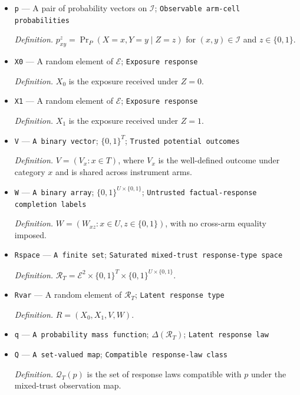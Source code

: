 \documentclass{article}
\begin{document}
\begin{itemize}
  \item \texttt{p} --- A pair of probability vectors on \(\mathcal I\); \texttt{Observable arm-\allowbreak{}cell probabilities}
  \par\smallskip\noindent\emph{Definition.} \(p^z_{xy}=\Pr_P(X=x,Y=y\mid Z=z)\) for \((x,y)\in\mathcal I\) and \(z\in\{0,1\}\).
  \item \texttt{X0} --- A random element of \(\mathcal E\); \texttt{Exposure response}
  \par\smallskip\noindent\emph{Definition.} \(X_0\) is the exposure received under \(Z=0\).
  \item \texttt{X1} --- A random element of \(\mathcal E\); \texttt{Exposure response}
  \par\smallskip\noindent\emph{Definition.} \(X_1\) is the exposure received under \(Z=1\).
  \item \texttt{V} --- \texttt{A binary vector}; \(\{0,1\}^{T}\); \texttt{Trusted potential outcomes}
  \par\smallskip\noindent\emph{Definition.} \(V=(V_x:x\in T)\), where \(V_x\) is the well-defined outcome under category \(x\) and is shared across instrument arms.
  \item \texttt{W} --- \texttt{A binary array}; \(\{0,1\}^{U\times\{0,1\}}\); \texttt{Untrusted factual-\allowbreak{}response completion labels}
  \par\smallskip\noindent\emph{Definition.} \(W=(W_{xz}:x\in U,z\in\{0,1\})\), with no cross-arm equality imposed.
  \item \texttt{Rspace} --- \texttt{A finite set}; \texttt{Saturated mixed-\allowbreak{}trust response-\allowbreak{}type space}
  \par\smallskip\noindent\emph{Definition.} \(\mathcal R_T=\mathcal E^2\times\{0,1\}^{T}\times\{0,1\}^{U\times\{0,1\}}\).
  \item \texttt{Rvar} --- A random element of \(\mathcal R_T\); \texttt{Latent response type}
  \par\smallskip\noindent\emph{Definition.} \(R=(X_0,X_1,V,W)\).
  \item \texttt{q} --- \texttt{A probability mass function}; \(\Delta(\mathcal R_T)\); \texttt{Latent response law}
  \item \texttt{Q} --- \texttt{A set-\allowbreak{}valued map}; \texttt{Compatible response-\allowbreak{}law class}
  \par\smallskip\noindent\emph{Definition.} \(\mathcal Q_T(p)\) is the set of response laws compatible with \(p\) under the mixed-trust observation map.

\end{itemize}
\end{document}
